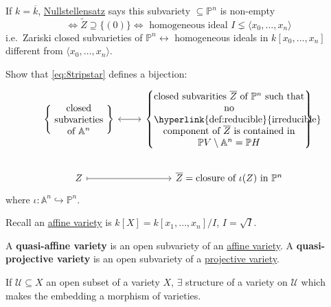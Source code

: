\documentclass{article}
\newcommand{\A}{\mathbb{A}}
\newcommand{\proj}{\mathbb{P}}
\begin{document}
If $k = \overline{k}$, \hyperlink{def:null2}{Nullstellensatz} says this subvariety $\subseteq \proj^n$ is non-empty
\begin{equation*}
    \iff \tilde{Z} \supseteq \{(0)\} \iff \text{ homogeneous ideal } I \lneq \langle x_0, \dotsc, x_n \rangle
\end{equation*}
i.e.\ Zariski closed subvarieties of $\proj^n \longleftrightarrow$ homogeneous ideals in $k[x_0, \dotsc, x_n]$ different from $\langle x_0, \dotsc, x_n \rangle$.
\begin{ex}
    Show that \eqref{eq:8tripstar} defines a bijection:
    \begin{equation*}
        \begin{tikzcd}
            \left\{\parbox{2cm}{\centering closed subvarieties of $\A^n$}\right\} \rar[leftrightarrow]&
            \left\{\parbox{5.5cm}{\centering closed subvarities $\overline{Z}$ of $\proj^n$ such that no \hyperlink{def:reducible}{irreducible} component of $\overline{Z}$ is contained in $\proj V \setminus \A^n = \proj H$ }\right\} \\
            Z \rar[mapsto] &\overline{Z} = \text{closure of } \iota(Z) \text{ in } \proj^n
        \end{tikzcd}
    \end{equation*}
    where $\iota: \A^n \hookrightarrow \proj^n$.
\end{ex}
Recall an \hyperlink{def:affVar}{affine variety} is $k[X] = k[x_1, \dotsc, x_n]/I$, $I = \sqrt{I}$.
\begin{defi}[Quasivarities]
    A \textbf{quasi-affine variety} is an open subvariety of an \hyperlink{def:affVar}{affine variety}.
    A \textbf{quasi-projective variety} is an open subvariety of a \hyperlink{def:projVar}{projective variety}.
\end{defi}
\begin{ex}
    If $\mathcal{U} \subseteq X$ an open subset of a variety $X$, $\exists$ structure of a variety on $\mathcal{U}$ which makes the embedding a morphism of varieties.
\end{ex}

\clearpage
\end{document}
